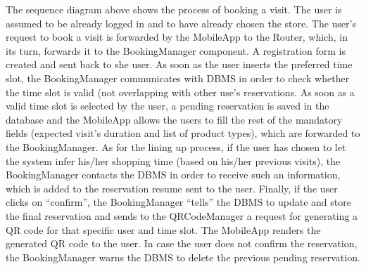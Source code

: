 \documentclass{article}
\begin{document}
\noindent The sequence diagram above shows the process of booking a visit. The user is assumed to be already logged in and to have already chosen the store. The user’s request to book a visit is forwarded by the MobileApp to the Router, which, in its turn, forwards it to the BookingManager component. A registration form is created and sent back to she user. As soon as the user inserts the preferred time slot, the BookingManager communicates with DBMS in order to check whether the time slot is valid (not overlapping with other use’s reservations. As soon as a valid time slot is selected by the user, a pending reservation is saved in the database and the MobileApp allows the users to fill the rest of the mandatory fields (expected visit’s duration and list of product types), which are forwarded to the BookingManager. As for the lining up process, if the user has chosen to let the system infer his/her shopping time (based on his/her previous visits), the BookingManager contacts the DBMS in order to receive such an information, which is added to the reservation resume sent to the user. Finally, if the user clicks on “confirm”, the BookingManager “tells” the DBMS to update and store the final reservation and sends to the QRCodeManager a request for generating a QR code for that specific user and time slot. The MobileApp renders the generated QR code to the user. In case the user does not confirm the reservation, the BookingManager warns the DBMS to delete the previous pending reservation.
\end{document}
